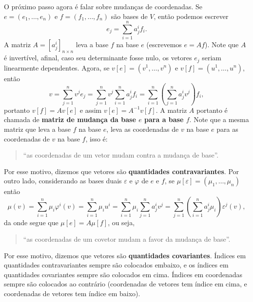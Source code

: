 \documentclass{article}
\renewcommand{\phi}{\varphi}
\begin{document}
O próximo passo agora é falar sobre mudanças de coordenadas. Se $e = (e_1, \dots, e_n)$ e $f = (f_1, \dots, f_n)$ são bases de $V$, então podemos escrever \begin{equation}
    e_j = \sum_{i = 1}^n a^i_j f_i.
\end{equation} A matriz $A = [a^i_j]_{n \times n}$ leva a base $f$ na base $e$ (escrevemos $e = Af$). Note que $A$ é invertível, afinal, caso seu determinante fosse nulo, os vetores $e_j$ seriam linearmente dependentes. Agora, se $v[e] = (v^1, \dots, v^n)$ e $v[f] = (u^1, \dots, u^n)$, então \begin{equation}
    v = \sum_{j = 1}^n v^j e_j = \sum_{j = 1}^n v^j \sum_{i = 1}^n a^i_j f_i = \sum_{i = 1}^n \left(\sum_{j = 1}^n a^i_j v^j\right) f_i,
\end{equation} portanto $v[f] = Av[e]$ e assim $v[e] = A^{-1}v[f]$. A matriz $A$ portanto é chamada de \textbf{matriz de mudança da base $e$ para a base $f$}. Note que a mesma matriz que leva a base $f$ na base $e$, leva as coordenadas de $v$ na base $e$ para as coordenadas de $v$ na base $f$, isso é: \begin{quotation}
    ``as coordenadas de um vetor mudam contra a mudança de base''.
\end{quotation} Por esse motivo, dizemos que vetores são \textbf{quantidades contravariantes}. Por outro lado, considerando as bases duais $\varepsilon$ e $\phi$ de $e$ e $f$, se $\mu[\varepsilon] = (\mu_1, \dots, \mu_n)$ então \begin{equation}
    \mu(v) = \sum_{i = 1}^n \mu_i \phi^i(v) = \sum_{i = 1}^n \mu_i u^i = \sum_{i = 1}^n \mu_i \sum_{j = 1}^n a^i_j v^j = \sum_{j = 1}^n \left(\sum_{i = 1}^n a^i_j \mu_i\right)\varepsilon^j(v),
\end{equation} da onde segue que $\mu[e] = A\mu[f]$, ou seja, \begin{quotation}
    ``as coordenadas de um covetor mudam a favor da mudança de base''.
\end{quotation} Por esse motivo, dizemos que vetores são \textbf{quantidades covariantes}. Índices em quantidades contravariantes sempre são colocados embaixo, e os índices em quantidades covariantes sempre são colocados em cima. Índices em coordenadas sempre são colocados ao contrário (coordenadas de vetores tem índice em cima, e coordenadas de vetores tem índice em baixo).
\end{document}
